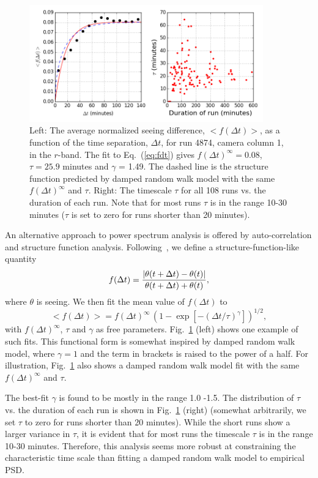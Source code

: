 \begin{figure}[th]
\centering
\includegraphics[width=0.9\textwidth]{FIGURES/fdt.png}
\caption{Left: The average normalized seeing difference, $<f(\Delta t)>$, as
  a function of the time separation, $\Delta t$, for run 4874, camera
   column 1, in the $r$-band. The fit to Eq.~(\ref{eq:fdt}) gives $f(\Delta t) ^\infty =  
   0.08$, $\tau = 25.9$ minutes and $\gamma$ = 1.49. The dashed line is the 
   structure function predicted by damped random walk model with the same 
   $f(\Delta t) ^\infty$ and $\tau$. 
Right: The timescale $\tau$ for all 108 runs vs. the duration of each run.
 Note that for most runs $\tau$ is in the range 10-30 minutes
    ($\tau$ is set to zero for runs shorter than 20 minutes).  
\label{fig:fdt}}
\end{figure}


An alternative approach to power spectrum analysis is offered by auto-correlation 
and structure function analysis. Following~\cite{Racine1996}, we define a 
structure-function-like quantity
\begin{equation}
       f(\Delta t) = {| \theta(t+\Delta t) - \theta(t)| \over  \theta(t+\Delta t) + \theta(t) },
\end{equation} 
where $\theta$ is seeing. We then fit the mean value of $f(\Delta t)$ to 
\begin{equation}
    < f(\Delta t) > =  f(\Delta t) ^\infty \, \left( 1 - \exp[-(\Delta
      t/\tau)^\gamma] \right)^{1/2},
\label{eq:fdt}
\end{equation} 
with $f(\Delta t) ^\infty$, $\tau$ and $\gamma$ as free parameters.
Fig.~\ref{fig:fdt} (left) shows one example of such fits. This functional form is 
somewhat inspired by damped random walk model, where $\gamma=1$ and the 
term in brackets is raised to the power of a half. For illustration, Fig.~\ref{fig:fdt} 
also shows a damped random walk model fit with the same $f(\Delta t) ^\infty$
and $\tau$. 

The best-fit $\gamma$ is found to be mostly in the range 1.0 -1.5. 
The distribution of $\tau$ vs. 
the duration of each run is shown in Fig.~\ref{fig:fdt} (right) (somewhat 
arbitrarily, we set $\tau$ to zero for runs shorter than 20 minutes).  
While the short runs show a larger variance in $\tau$, it is evident that 
for most runs the timescale $\tau$ is in the range 10-30 minutes.
Therefore, this analysis seems more robust at constraining the characteristic time
scale than fitting a damped random walk model to empirical PSD. 

